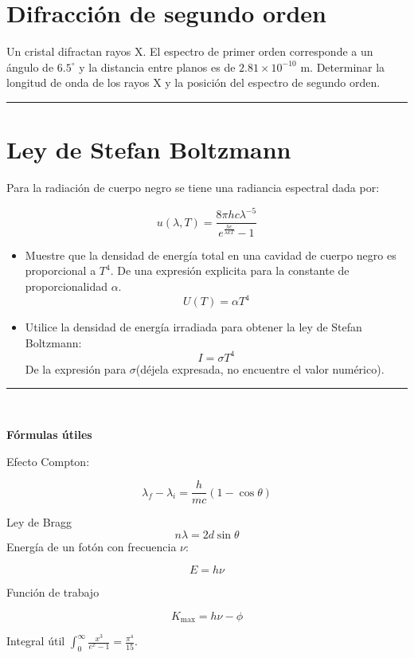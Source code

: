 \documentclass[12pt]{article}
\begin{document}
\section{Difracción de segundo orden}

	Un cristal difractan rayos X. El espectro de primer orden corresponde a un
	ángulo de $6.5^{\circ}$ y la distancia entre planos es de $2.81 \times 10^{-10}$ m. Determinar la
	longitud de onda de los rayos X y la posición del espectro de segundo orden.

\noindent\rule{16.5cm}{0.4pt}


\section{Ley de Stefan Boltzmann}

	Para la radiación de cuerpo negro se tiene una radiancia espectral dada por:
	
	\begin{equation}
	u(\lambda,T) = \frac{8\pi h c \lambda^{-5}}{e^{\frac{hc}{\lambda k T}}-1}
	\end{equation}
	
	
	\begin{itemize}
		\item Muestre que la densidad de energía total en una cavidad de cuerpo negro es proporcional a
		$T^4$.
		De una expresión explicita para la constante de proporcionalidad $\alpha$.
		\begin{equation*}
		U(T) = \alpha T^4
		\end{equation*}
		\item Utilice la densidad de energía irradiada para obtener la ley de Stefan Boltzmann:
		$$I = \sigma T^4$$
		De la expresión para $\sigma$(déjela expresada, no encuentre el valor numérico). 
	\end{itemize}

\noindent\rule{16.5cm}{0.4pt}
\\

\begin{center}
\textbf{Fórmulas útiles}
\end{center}



Efecto Compton:

\begin{equation*}
\lambda_f - \lambda_i = \frac{h}{mc}(1-\cos\theta)
\end{equation*}

Ley de Bragg
\begin{equation*}
n \lambda = 2 d \sin\theta
\end{equation*}
Energía de un fotón con frecuencia $\nu$:


\begin{equation*}
E  = h \nu 
\end{equation*}


Función de trabajo

\begin{equation*}
K_{\text{max}} = h \nu - \phi
\end{equation*}

Integral útil $ \int_{0}^{\infty}\frac{x^3}{e^{x}-1}= \frac{\pi^4}{15}$.
\end{document}
